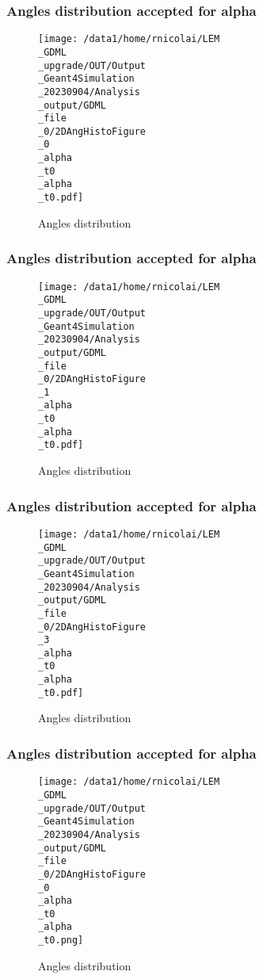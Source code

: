 \documentclass[8pt]{beamer}
\begin{document}
            \begin{frame}
                \frametitle{Angles distribution accepted for alpha}
            
        \begin{figure}[h]
            \centering
            \texttt{[image: /data1/home/rnicolai/LEM\\\_GDML\\\_upgrade/OUT/Output\\\_Geant4Simulation\\\_20230904/Analysis\\\_output/GDML\\\_file\\\_0/2DAngHistoFigure\\\_0\\\_alpha\\\_t0\\\_alpha\\\_t0.pdf]}
            \caption{Angles distribution}
        \end{figure}
        
            \end{frame}
            
            \begin{frame}
                \frametitle{Angles distribution accepted for alpha}
            
        \begin{figure}[h]
            \centering
            \texttt{[image: /data1/home/rnicolai/LEM\\\_GDML\\\_upgrade/OUT/Output\\\_Geant4Simulation\\\_20230904/Analysis\\\_output/GDML\\\_file\\\_0/2DAngHistoFigure\\\_1\\\_alpha\\\_t0\\\_alpha\\\_t0.pdf]}
            \caption{Angles distribution}
        \end{figure}
        
            \end{frame}
            
            \begin{frame}
                \frametitle{Angles distribution accepted for alpha}
            
        \begin{figure}[h]
            \centering
            \texttt{[image: /data1/home/rnicolai/LEM\\\_GDML\\\_upgrade/OUT/Output\\\_Geant4Simulation\\\_20230904/Analysis\\\_output/GDML\\\_file\\\_0/2DAngHistoFigure\\\_3\\\_alpha\\\_t0\\\_alpha\\\_t0.pdf]}
            \caption{Angles distribution}
        \end{figure}
        
            \end{frame}
            
            \begin{frame}
                \frametitle{Angles distribution accepted for alpha}
            
        \begin{figure}[h]
            \centering
            \texttt{[image: /data1/home/rnicolai/LEM\\\_GDML\\\_upgrade/OUT/Output\\\_Geant4Simulation\\\_20230904/Analysis\\\_output/GDML\\\_file\\\_0/2DAngHistoFigure\\\_0\\\_alpha\\\_t0\\\_alpha\\\_t0.png]}
            \caption{Angles distribution}
        \end{figure}
        
            \end{frame}
            
\end{document}
